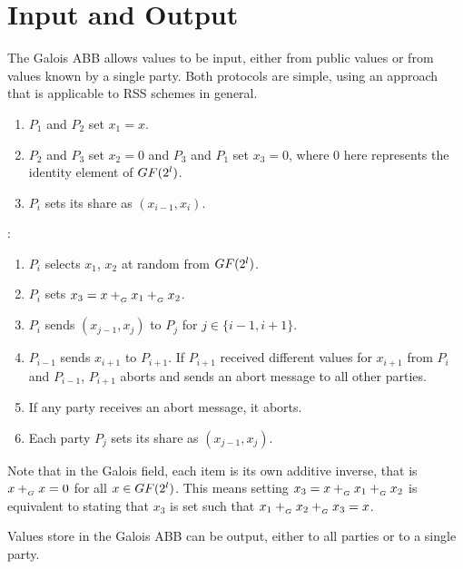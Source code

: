 \section{Input and Output}

The Galois ABB allows values to be input, either from public values
or from values known by a single party.
Both protocols are simple, using an approach that is applicable
to RSS schemes in general.

\begin{protocol}[Input]
	\begin{enumerate}
		\item $P_1$ and $P_2$ set $x_1 = x$.
		\item $P_2$ and $P_3$ set $x_2 = 0$ and 
			$P_3$ and $P_1$ set $x_3 = 0$, 
			where 0 here represents the identity element
			of $GF(2^l)$.
		\item $P_i$ sets its share as $(x_{i-1}, x_i)$.
	\end{enumerate}

	\noindent {}:
	\begin{enumerate}
		\item $P_i$ selects $x_1$, $x_2$ at random from $GF(2^l)$.
		\item $P_i$ sets $x_3 = x +_{_G} x_1 +_{_G} x_2$.
		\item $P_i$ sends $(x_{j-1}, x_j)$ to $P_j$
			for $j \in \{i-1, i+1\}$.
		\item $P_{i-1}$ sends $x_{i+1}$ to $P_{i+1}$.
			If $P_{i+1}$ received different values for $x_{i+1}$
			from $P_i$ and $P_{i-1}$, $P_{i+1}$ aborts
			and sends an abort message to all other parties.
		\item If any party receives an abort message, it aborts.
		\item Each party $P_j$ sets its share as $(x_{j-1}, x_j)$.
	\end{enumerate}
\end{protocol}

Note that in the Galois field, each item is its own additive inverse,
that is $x +_{_G} x = 0$ for all $x \in GF(2^l)$.
This means setting $x_3 = x +_{_G} x_1 +_{_G} x_2$ is equivalent
to stating that $x_3$ is set such that $x_1 +_{_G} x_2 +_{_G} x_3 = x$.

Values store in the Galois ABB can be output, either to all parties
or to a single party.

